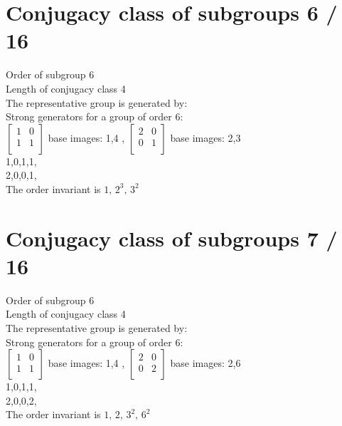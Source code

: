 \section{Conjugacy class of subgroups 6 / 16}
Order of subgroup 6\\
Length of conjugacy class 4\\
The representative group is generated by:\\
Strong generators for a group of order 6:\\
$
\left[
\begin{array}{*{2}{r}}
1 & 0\\
1 & 1\\
\end{array}
\right]
$
base images: 1,4 , 
$
\left[
\begin{array}{*{2}{r}}
2 & 0\\
0 & 1\\
\end{array}
\right]
$
base images: 2,3 \\
1,0,1,1,\\
2,0,0,1,\\
The order invariant is $1,\,2^3,\,3^2$\\
\section{Conjugacy class of subgroups 7 / 16}
Order of subgroup 6\\
Length of conjugacy class 4\\
The representative group is generated by:\\
Strong generators for a group of order 6:\\
$
\left[
\begin{array}{*{2}{r}}
1 & 0\\
1 & 1\\
\end{array}
\right]
$
base images: 1,4 , 
$
\left[
\begin{array}{*{2}{r}}
2 & 0\\
0 & 2\\
\end{array}
\right]
$
base images: 2,6 \\
1,0,1,1,\\
2,0,0,2,\\
The order invariant is $1,\,2,\,3^2,\,6^2$\\
